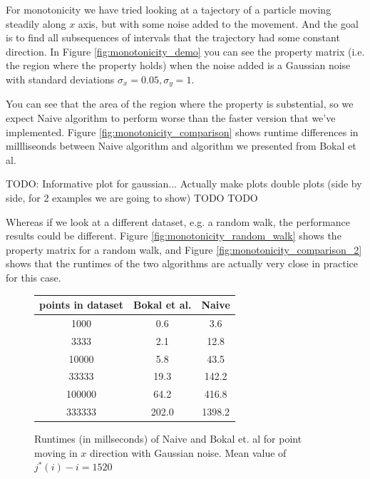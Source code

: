 \documentclass{article}
\begin{document}
For monotonicity we have tried looking at a tajectory of a particle
moving steadily along $x$ axis, but with some noise added to the
movement. And the goal is to find all subsequences of intervals
that the trajectory had some constant direction. In Figure
\ref{fig:monotonicity_demo} you can see the property matrix (i.e. the region where the property holds) when the noise added is a Gaussian
noise with standard deviations $\sigma_x = 0.05, \sigma_y = 1$.

You can see that the area of the region where the property is substential, so we expect Naive algorithm to perform worse than the faster version that we've implemented. 
Figure \ref{fig:monotonicity_comparison} shows runtime differences in millliseonds between Naive algorithm and algorithm we presented from Bokal et al.

TODO: Informative plot for gaussian... Actually make plots double plots (side by side, for 2 examples we are going to show) TODO TODO

Whereas if we look at a different dataset, e.g. a random walk, the
performance results could be different. Figure
\ref{fig:monotonicity_random_walk} shows the property matrix for a
random walk, and Figure \ref{fig:monotonicity_comparison_2} shows
that the runtimes of the two algorithms are actually very close in
practice for this case.

\begin{figure}[!ht]
    \centering
    \begin{tabular}{c|c|c}
        points in dataset & Bokal et al. & Naive  \\
    \hline
        1000    & 0.6    & 3.6  \\
    \hline
        3333    & 2.1    & 12.8  \\
    \hline
        10000    & 5.8    & 43.5  \\
    \hline
        33333    & 19.3    & 142.2  \\
    \hline
        100000    & 64.2    & 416.8  \\
    \hline
        333333    & 202.0    & 1398.2  \\
    \end{tabular}
    \caption{Runtimes (in millseconds) of Naive and Bokal et. al for point moving in $x$ direction with Gaussian noise. Mean value of $j^*(i) - i = 1520$}
    \label{fig:monotonicity_comparison_moving_gaussian}
\end{figure}
\end{document}
